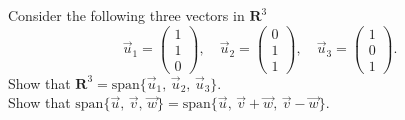 \documentclass[a4paper,11pt]{article}
\newcommand{\R}{\mathbf{R}}
\begin{document}
 Consider the following three vectors in $\R^3$
\[
  \vec u_1 = \begin{pmatrix}1\\1\\0\end{pmatrix},\quad
  \vec u_2 = \begin{pmatrix}0\\1\\1\end{pmatrix},\quad
  \vec u_3 = \begin{pmatrix}1\\0\\1\end{pmatrix}.
\]
Show that $\R^3=\text{span}\{\vec u_1,\,\vec u_2,\,\vec u_3\}$. \\

 Show that
$\text{span}\{\vec u,\,\vec v,\,\vec w\}=\text{span}\{\vec u,\,\vec v+\vec
w,\,\vec v-\vec w\}$. \\
\end{document}
